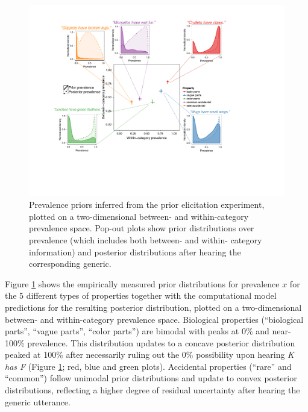 \documentclass[10pt,letterpaper]{article}
\begin{document}
\begin{figure}
\centering
    \includegraphics[width=1\columnwidth]{prevalence-asymmetry-scatterwDists.pdf}
    \caption{Prevalence priors inferred from the prior elicitation experiment, plotted on a two-dimensional between- and within-category prevalence space. 
    Pop-out plots show prior distributions over prevalence (which includes both between- and within- category information) and posterior distributions after hearing the corresponding generic. }
  \label{fig:prior2}
\end{figure}


Figure \ref{fig:prior2} shows the empirically measured prior distributions for prevalence $x$ for the 5 different types of properties together with the computational model predictions for the resulting posterior distribution, plotted on a two-dimensional between- and within-category prevalence space. 
Biological properties (``biological parts'', ``vague parts'', ``color parts'') are bimodal with peaks at 0\% and near-100\% prevalence. 
This distribution updates to a concave posterior distribution peaked at 100\% after necessarily ruling out the 0\% possibility upon hearing \emph{K has F} (Figure \ref{fig:prior2}; red, blue and green plots). 
Accidental properties (``rare'' and ``common'') follow unimodal prior distributions and update to convex posterior distributions, reflecting a higher degree of residual uncertainty after hearing the generic utterance. 
\end{document}
